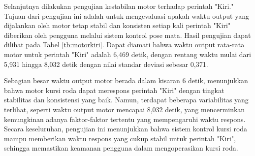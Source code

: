 Selanjutnya dilakukan pengujian kestabilan motor terhadap perintah "Kiri." Tujuan dari pengujian ini adalah untuk mengevaluasi apakah waktu output yang dijalankan oleh motor tetap stabil dan konsisten setiap kali perintah "Kiri" diberikan oleh pengguna melalui sistem kontrol pose mata. Hasil pengujian dapat dilihat pada Tabel \ref{tb:motorkiri}. Dapat diamati bahwa waktu output rata-rata motor untuk perintah "Kiri" adalah 6,469 detik, dengan rentang waktu mulai dari 5,931 hingga 8,032 detik dengan nilai standar deviasi sebesar 0,371.

Sebagian besar waktu output motor berada dalam kisaran 6 detik, menunjukkan bahwa motor kursi roda dapat merespons perintah "Kiri" dengan tingkat stabilitas dan konsistensi yang baik. Namun, terdapat beberapa variabilitas yang terlihat, seperti waktu output motor mencapai 8,032 detik, yang mencerminkan kemungkinan adanya faktor-faktor tertentu yang mempengaruhi waktu respons. Secara keseluruhan, pengujian ini menunjukkan bahwa sistem kontrol kursi roda mampu memberikan waktu respons yang cukup stabil untuk perintah "Kiri", sehingga memastikan keamanan pengguna dalam mengoperasikan kursi roda.

